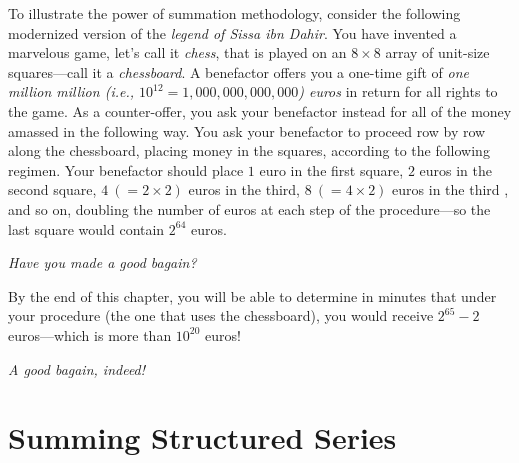 \bigskip








To illustrate the power of summation methodology, consider the
following modernized version of the {\it legend of Sissa ibn Dahir}.
You have invented a marvelous game, let's call it {\it chess}, that is
played on an $8 \times 8$ array of unit-size squares---call it a {\it
  chessboard}.  A benefactor offers you a one-time gift of {\em one
  million million (i.e., $10^{12} = 1,000,000,000,000$) euros} in
return for all rights to the game.  As a counter-offer, you ask your
benefactor instead for all of the money amassed in the following way.
You ask your benefactor to proceed row by row along the chessboard,
placing money in the squares, according to the following regimen.
Your benefactor should place $1$ euro in the first square, $2$ euros
in the second square, $4 \ (= 2 \times 2)$ euros in the third, $8 \ (=
4 \times 2)$ euros in the third , and so on, doubling the number of
euros at each step of the procedure---so the last square would contain
$2^{64}$ euros.

\noindent
{\em Have you made a good bagain?}

\medskip

By the end of this chapter, you will be able to determine in minutes
that under your procedure (the one that uses the chessboard), you
would receive $2^{65} -2$ euros---which is more than $10^{20}$ euros!

\noindent
{\em A good bagain, indeed!}



\section{Summing Structured Series}
\label{sec:structured-series}

